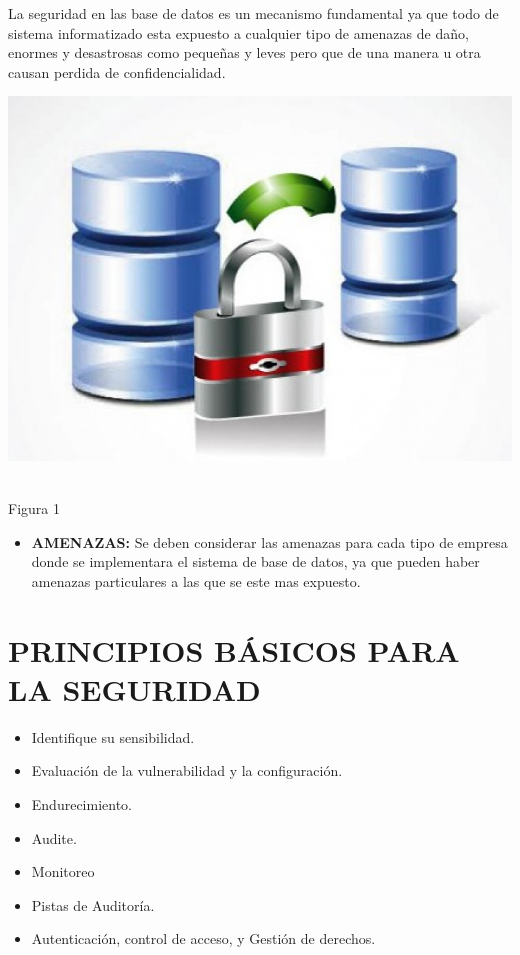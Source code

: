 \documentclass[conference]{IEEEtran}
\begin{document}
La seguridad en las base de datos es un mecanismo fundamental ya que todo de sistema informatizado esta expuesto a cualquier tipo de amenazas de daño, enormes y desastrosas como pequeñas y leves pero que de una manera u otra causan perdida de confidencialidad.
\\
\begin{flushright}
  \includegraphics[scale=0.31]{Imagenes/seguridadbd.jpg}
\end{flushright}
\centering
\\Figura 1
\\

\begin{itemize}
\item \textbf{AMENAZAS:} Se deben considerar las amenazas para cada tipo de empresa donde se implementara el sistema de base de datos, ya que pueden haber amenazas particulares a las que se este mas expuesto.
\end{itemize}

\section{PRINCIPIOS BÁSICOS PARA LA SEGURIDAD}

\begin{itemize}
\item \textbf{}Identifique su sensibilidad.
\item \textbf{}Evaluación de la vulnerabilidad y la configuración. 
\item \textbf{}Endurecimiento. 
\item \textbf{}Audite. 
\item \textbf{}Monitoreo 
\item \textbf{}Pistas de Auditoría.
\item \textbf{}Autenticación, control de acceso, y Gestión de derechos.
\end{itemize}
\end{document}

